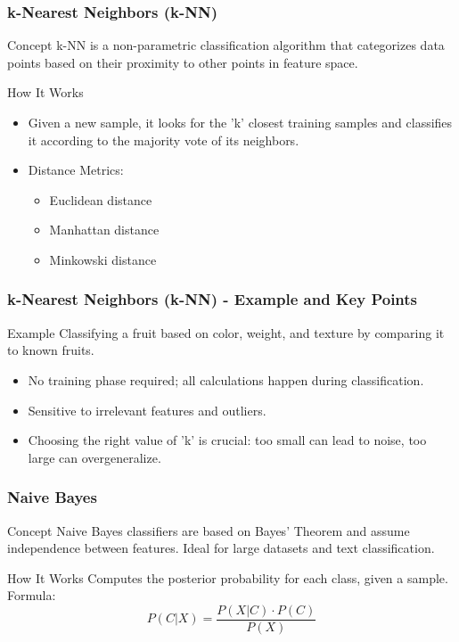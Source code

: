\documentclass[aspectratio=169]{beamer}
\begin{document}
\begin{frame}[fragile]
    \frametitle{k-Nearest Neighbors (k-NN)}
    \begin{block}{Concept}
        k-NN is a non-parametric classification algorithm that categorizes data points based on their proximity to other points in feature space.
    \end{block}
    \begin{block}{How It Works}
        \begin{itemize}
            \item Given a new sample, it looks for the 'k' closest training samples and classifies it according to the majority vote of its neighbors.
            \item Distance Metrics: 
            \begin{itemize}
                \item Euclidean distance
                \item Manhattan distance
                \item Minkowski distance
            \end{itemize}
        \end{itemize}
    \end{block}
\end{frame}

\begin{frame}[fragile]
    \frametitle{k-Nearest Neighbors (k-NN) - Example and Key Points}
    \begin{block}{Example}
        Classifying a fruit based on color, weight, and texture by comparing it to known fruits.
    \end{block}
    \begin{itemize}
        \item No training phase required; all calculations happen during classification.
        \item Sensitive to irrelevant features and outliers.
        \item Choosing the right value of 'k' is crucial: too small can lead to noise, too large can overgeneralize.
    \end{itemize}
\end{frame}

\begin{frame}[fragile]
    \frametitle{Naive Bayes}
    \begin{block}{Concept}
        Naive Bayes classifiers are based on Bayes' Theorem and assume independence between features. Ideal for large datasets and text classification.
    \end{block}
    \begin{block}{How It Works}
        Computes the posterior probability for each class, given a sample. Formula:
        \[
        P(C|X) = \frac{P(X|C) \cdot P(C)}{P(X)}
        \]
    \end{block}
\end{frame}
\end{document}
